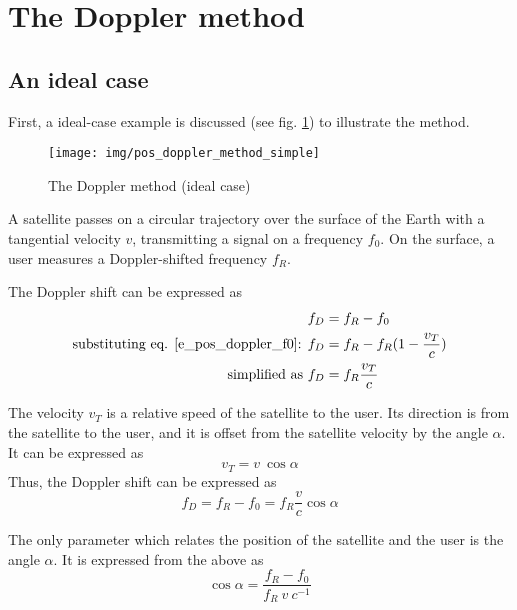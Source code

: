 \section{The Doppler method}
\label{s_pos_doppler_method}
 

\subsection{An ideal case}
First, a ideal-case example is discussed (see fig. \ref{f_pos_doppler_method_simple}) to illustrate the method.

\begin{figure}
    \centering
    \texttt{[image: img/pos\_doppler\_method\_simple]}
    \caption{The Doppler method (ideal case)}
    \label{f_pos_doppler_method_simple}
\end{figure}

A satellite passes on a circular trajectory over the surface of the Earth with a tangential velocity $v$, transmitting a signal on a frequency $f_0$. On the surface, a user measures a Doppler-shifted frequency $f_R$.

The Doppler shift can be expressed as
\begin{align*}
    f_D &= f_R - f_0 \\
    \textnormal{substituting eq. \ref{e_pos_doppler_f0}: } 
    f_D &= f_R - f_R (1 - \frac{v_T}{c}) \\
    \textnormal{simplified as } 
    f_D &= f_R \frac{v_T}{c}
\end{align*}

The velocity $v_T$ is a relative speed of the satellite to the user. Its direction is from the satellite to the user, and it is offset from the satellite velocity by the angle $\alpha$. It can be expressed as
\begin{equation*}
    v_T = v \ \cos{\alpha}
\end{equation*}
Thus, the Doppler shift can be expressed as
\begin{equation}
    \label{e_pos_fd}
    f_D = f_R - f_0 = f_R \frac{v}{c} \cos{\alpha}
\end{equation}

The only parameter which relates the position of the satellite and the user is the angle $\alpha$. It is expressed from the above as
\begin{equation}
    \label{e_pos_cos_alpha}
    \cos{\alpha} = \frac{f_R - f_0}{f_R \ v \ c^{-1}}
\end{equation}

